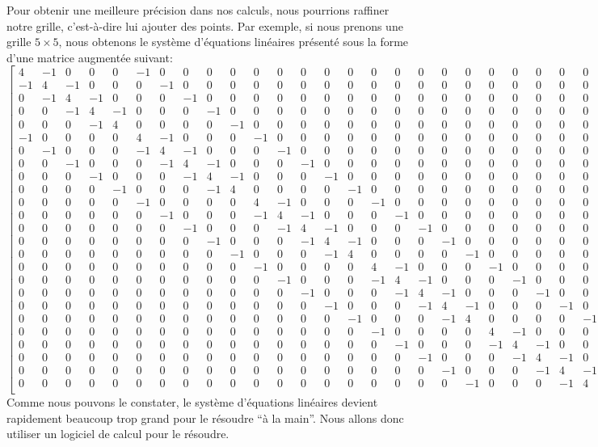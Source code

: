 \documentclass[]{book}
\theoremstyle{definition}
\theoremstyle{definition}
\theoremstyle{definition}
\theoremstyle{remark}
\begin{document}
Pour obtenir une meilleure précision dans nos calculs, nous pourrions raffiner notre grille, c'est-à-dire lui ajouter des points. Par exemple, si nous prenons une grille \(5\times 5\),
nous obtenons le système d'équations linéaires présenté sous la forme d'une matrice augmentée suivant:
\[
\left[
\begin{smallmatrix}
4&-1&0&0&0&-1&0&0&0&0&0&0&0&0&0&0&0&0&0&0&0&0&0&0&0&250\\
-1&4&-1&0&0&0&-1&0&0&0&0&0&0&0&0&0&0&0&0&0&0&0&0&0&0&140\\
0&-1&4&-1&0&0&0&-1&0&0&0&0&0&0&0&0&0&0&0&0&0&0&0&0&0&140\\
0&0&-1&4&-1&0&0&0&-1&0&0&0&0&0&0&0&0&0&0&0&0&0&0&0&0&140\\
0&0&0&-1&4&0&0&0&0&-1&0&0&0&0&0&0&0&0&0&0&0&0&0&0&0&260\\
-1&0&0&0&0&4&-1&0&0&0&-1&0&0&0&0&0&0&0&0&0&0&0&0&0&0&110\\
0&-1&0&0&0&-1&4&-1&0&0&0&-1&0&0&0&0&0&0&0&0&0&0&0&0&0&0\\
0&0&-1&0&0&0&-1&4&-1&0&0&0&-1&0&0&0&0&0&0&0&0&0&0&0&0&0\\
0&0&0&-1&0&0&0&-1&4&-1&0&0&0&-1&0&0&0&0&0&0&0&0&0&0&0&0\\
0&0&0&0&-1&0&0&0&-1&4&0&0&0&0&-1&0&0&0&0&0&0&0&0&0&0&120\\
0&0&0&0&0&-1&0&0&0&0&4&-1&0&0&0&-1&0&0&0&0&0&0&0&0&0&110\\
0&0&0&0&0&0&-1&0&0&0&-1&4&-1&0&0&0&-1&0&0&0&0&0&0&0&0&0\\
0&0&0&0&0&0&0&-1&0&0&0&-1&4&-1&0&0&0&-1&0&0&0&0&0&0&0&0\\
0&0&0&0&0&0&0&0&-1&0&0&0&-1&4&-1&0&0&0&-1&0&0&0&0&0&0&0\\
0&0&0&0&0&0&0&0&0&-1&0&0&0&-1&4&0&0&0&0&-1&0&0&0&0&0&120\\
0&0&0&0&0&0&0&0&0&0&-1&0&0&0&0&4&-1&0&0&0&-1&0&0&0&0&110\\
0&0&0&0&0&0&0&0&0&0&0&-1&0&0&0&-1&4&-1&0&0&0&-1&0&0&0&0\\
0&0&0&0&0&0&0&0&0&0&0&0&-1&0&0&0&-1&4&-1&0&0&0&-1&0&0&0\\
0&0&0&0&0&0&0&0&0&0&0&0&0&-1&0&0&0&-1&4&-1&0&0&0&-1&0&0\\
0&0&0&0&0&0&0&0&0&0&0&0&0&0&-1&0&0&0&-1&4&0&0&0&0&-1&120\\
0&0&0&0&0&0&0&0&0&0&0&0&0&0&0&-1&0&0&0&0&4&-1&0&0&0&240\\
0&0&0&0&0&0&0&0&0&0&0&0&0&0&0&0&-1&0&0&0&-1&4&-1&0&0&130\\
0&0&0&0&0&0&0&0&0&0&0&0&0&0&0&0&0&-1&0&0&0&-1&4&-1&0&130\\
0&0&0&0&0&0&0&0&0&0&0&0&0&0&0&0&0&0&-1&0&0&0&-1&4&-1&130\\
0&0&0&0&0&0&0&0&0&0&0&0&0&0&0&0&0&0&0&-1&0&0&0&-1&4&250\\
\end{smallmatrix}
\right]
\]
Comme nous pouvons le constater, le système d'équations linéaires devient rapidement beaucoup trop grand pour le résoudre ``à la main''. Nous allons donc utiliser un logiciel de calcul pour le résoudre.


\end{document}

